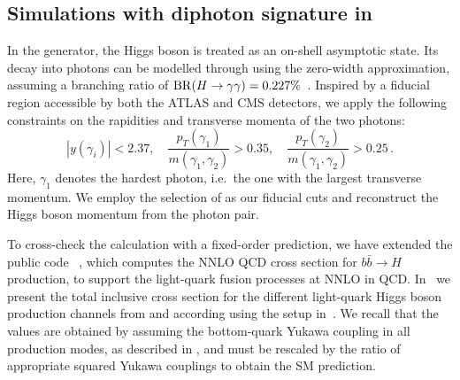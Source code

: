 \documentclass[11pt,a4paper]{article}
\begin{document}
\subsection{Simulations with diphoton signature in \minnlo{}}

In the \minnlo{} generator, the Higgs boson is treated as an on-shell asymptotic state. 
Its decay into photons can be modelled through  using the 
zero-width approximation, assuming a branching ratio of
 ${\rm BR}(H \to \gamma\gamma) = 0.227\%$~\cite{LHCHiggsCrossSectionWorkingGroup:2016ypw}.
Inspired by a fiducial region accessible by both the ATLAS and CMS detectors, we apply the following constraints on the rapidities and transverse momenta of the two photons:
\begin{equation}
|y(\gamma_i)|< 2.37, \quad
\frac{p_T(\gamma_1)}{m(\gamma_1, \gamma_2)} > 0.35,\quad \frac{p_T(\gamma_2)}{m(\gamma_1, \gamma_2)} > 0.25\,. \label{eq:aafidmycuts}
\end{equation}
Here, $ \gamma_1 $ denotes the hardest photon, i.e.\ the one with the largest transverse momentum. We employ the selection of  as our fiducial cuts 
and reconstruct the Higgs boson momentum from the photon pair.

To cross-check the \minnlo{} calculation with a fixed-order prediction, we have extended the public code \SuSHi{}~\cite{Harlander:2012pb,Harlander:2003ai},
which computes the NNLO QCD cross section for  $b\bar b\to H$ production,
to support the light-quark fusion processes at NNLO in QCD. 
In~ we present the total inclusive cross section for
the different light-quark Higgs boson production channels from 
\SuSHi{} and \minnlo{} according using the setup in~. 
We recall that the values are obtained by assuming 
the bottom-quark Yukawa coupling in all production modes, 
as described in , and must be rescaled by the ratio of appropriate 
squared Yukawa couplings to obtain the SM prediction. 
\end{document}
